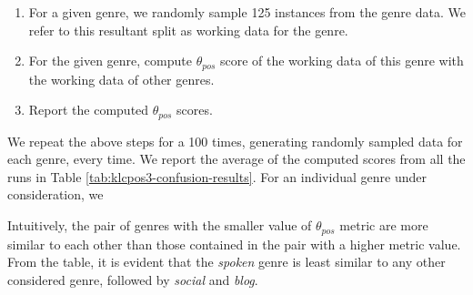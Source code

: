 \begin{enumerate}
    \item For a given genre, we randomly sample 125 instances from the genre data. We refer to this resultant split as working data for the genre.
    \item For the given genre, compute $\theta_{pos}$ score of the working data of this genre with the working data of other genres.
    \item Report the computed $\theta_{pos}$ scores.
\end{enumerate}

We repeat the above steps for a 100 times, generating randomly sampled data for each genre, every time. We report the average of the computed scores from all the runs in Table \ref{tab:klcpos3-confusion-results}. For an individual genre under consideration, we 


Intuitively, the pair of genres with the smaller value of $\theta_{pos}$ metric are more similar to each other than those contained in the pair with a higher metric value. From the table, it is evident that the \textit{spoken} genre is least similar to any other considered genre, followed by \textit{social} and \textit{blog}. 


\newpage